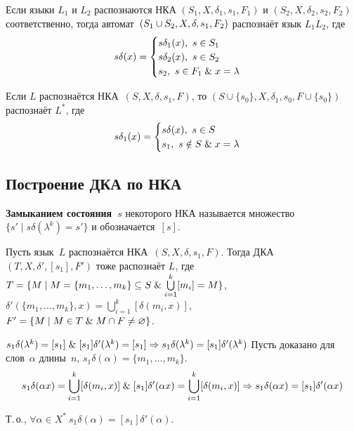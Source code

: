 Если языки $L_1$ и $L_2$ распознаются НКА $(S_1, X, \delta_1, s_1, F_1)$ и $(S_2, X, \delta_2, s_2, F_2)$ соответственно, тогда автомат~$(S_1 \opbr\cup S_2, \allowbreak X, \allowbreak \delta, \allowbreak s_1, \allowbreak F_2)$ распознаёт язык $L_1 L_2$, где
\begin{equation*}
s \delta(x) =
\begin{cases}
s \delta_1(x), \ s \in S_1 \\
s \delta_2(x), \ s \in S_2 \\
s_2, \ s \in F_1 \mathrel{\&} x = \lambda
\end{cases}
\end{equation*}

Если $L$ распознаётся НКА~$(S, X, \delta, s_1, F)$, то $(S \cup \{ s_0 \}, X, \delta_1, s_0, F \cup \{ s_0 \})$ распознаёт $L^*$, где
\begin{equation*}
s \delta_1(x) =
\begin{cases}
s \delta(x), \ s \in S \\
s_1, \ s \notin S \mathrel{\&} x = \lambda
\end{cases}
\end{equation*}

\subsection{Построение ДКА по НКА}
 \textbf{Замыканием состояния~$s$} некоторого НКА называется множество~$\{ s' \mid s \delta(\lambda^k) = s' \}$ и обозначается~$[s]$.

Пусть язык~$L$ распознаётся НКА~$(S, X, \delta, s_1, F)$.
Тогда ДКА~$(T, X, \delta', [s_1], F')$ тоже распознаёт $L$, где\\
$T = \{ M \mid M = \{ m_1, \ldots, m_k \} \subseteq S \mathrel{\&} \bigcup\limits_{i=1}^k [m_i] = M \}$,\\
$\delta'(\{ m_1, \ldots, m_k \}, x) = \bigcup\limits_{i=1}^k [\delta(m_i, x)]$,\\
$F' = \{ M \mid M \in T \mathrel{\&} M \cap F \neq \varnothing \}$.
\begin{proofmathind}
	\indbase $s_1 \delta(\lambda^k) = [s_1] \mathrel{\&} [s_1] \delta'(\lambda^k) = [s_1] \Rightarrow
	s_1 \delta(\lambda^k) = [s_1] \delta'(\lambda^k)$
	\indstep Пусть доказано для слов~$\alpha$ длины~$n$, $s_1 \delta(\alpha) = \{ m_1, \ldots, m_k \}$.
	\begin{equation*}
	s_1 \delta(\alpha x) = \bigcup_{i=1}^k [\delta(m_i, x)] \mathrel{\&}
	[s_1] \delta'(\alpha x) = \bigcup_{i=1}^k [\delta(m_i, x)] \Rightarrow
	s_1 \delta(\alpha x) = [s_1] \delta'(\alpha x)
	\end{equation*}
	\indend
	
Т.\,о., $\forall \alpha \in X^* \ s_1 \delta(\alpha) = [s_1] \delta'(\alpha)$.
\end{proofmathind}


